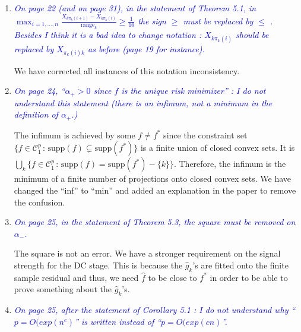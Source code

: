 \documentclass[pdftex,12pt]{article}
\let\hat\widehat
\def\rc#1{{\it\textcolor{blue}{#1}}\smallskip}
\begin{document}
\begin{enumerate}

\item \rc{On page 22 (and on page 31), in the statement of Theorem
  5.1, in\\ $\max_{i=1,\ldots, n} \frac{X_{k\pi_k(i+1)}-
    X_{k\pi_k(i)}}{\text{range}_k} \geq \frac{1}{16}$ the
sign $\geq$ must be replaced by $\leq$ . Besides I think it
is a bad idea to change notation : $X_{k\pi_k(i)}$ should
be replaced by $X_{\pi_k(i)k}$ as before (page 19 for instance).}

We have corrected all instances of this notation inconsistency.


\item \rc{On page 24, ``$\alpha_{+} > 0$ since $f$ is the unique risk minimizer'' : I do
not understand this statement (there is an infimum, not a minimum in
the definition of $\alpha_{+}$.)}

The infimum is achieved by some $f \neq f^*$ since the constraint set $\{ f \in \mathcal{C}^p_1 \,:\, \textrm{supp}(f) \subsetneq \textrm{supp}(f^*)\}$ is a finite union of closed convex sets. It is $\bigcup_k \{ f \in \mathcal{C}^p_1 \,:\, \textrm{supp}(f) = \textrm{supp}(f^*) - \{k\}\}$. Therefore, the infimum is the minimum of a finite number of projections onto closed convex sets. We have changed the ``inf'' to ``min'' and added an explanation in the paper to remove the confusion.


\item \rc{On page 25, in the statement of Theorem 5.3, the square must be
removed on $\alpha_-$.}

The square is not an error. We have a stronger requirement on the signal strength for the DC stage. This is because the $\hat{g}_k$'s are fitted onto the finite sample residual and thus, we need $\hat{f}$ to be close to $f^*$ in order to be able to prove something about the $\hat{g}_k$'s.

\item \rc{On page 25, after the statement of Corollary 5.1 : I do not understand
why ``$p = O(exp(n^c)$'' is written instead of ``$p = O(exp(cn)$''.}


\end{enumerate}
\end{document}
